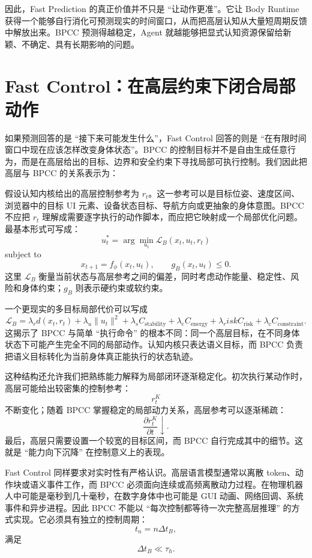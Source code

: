 因此，Fast Prediction 的真正价值并不只是 ``让动作更准''。它让 Body Runtime 获得一个能够自行消化可预测现实的时间窗口，从而把高层认知从大量短周期反馈中解放出来。BPCC 预测得越稳定，Agent 就越能够把显式认知资源保留给新颖、不确定、具有长期影响的问题。

\section{Fast Control：在高层约束下闭合局部动作}

如果预测回答的是 ``接下来可能发生什么''，Fast Control 回答的则是 ``在有限时间窗口中现在应该怎样改变身体状态''。BPCC 的控制目标并不是自由生成任意行为，而是在高层给出的目标、边界和安全约束下寻找局部可执行控制。我们因此把高层与 BPCC 的关系表示为：
\begin{statementbox}
\centering
{}
\end{statementbox}

假设认知内核给出的高层控制参考为 $r_t$。这一参考可以是目标位姿、速度区间、浏览器中的目标 UI 元素、设备状态目标、导航方向或更抽象的身体意图。BPCC 不应把 $r_t$ 理解成需要逐字执行的动作脚本，而应把它映射成一个局部优化问题。最基本形式可写成：
\[
u_t^\ast
=
\arg\min_{u_t}
\mathcal L_B
(x_t,u_t,r_t)
\]
subject to
\[
x_{t+1}=f_\phi(x_t,u_t),
\qquad
g_B(x_t,u_t)\leq0.
\]
这里 $\mathcal L_B$ 衡量当前状态与高层参考之间的偏差，同时考虑动作能量、稳定性、风险和身体约束；$g_B$ 则表示硬约束或软约束。

一个更现实的多目标局部代价可以写成
\[
\mathcal L_B
=
\lambda_r d(x_t,r_t)
+
\lambda_u\|u_t\|^2
+
\lambda_s C_{\mathrm{stability}}
+
\lambda_e C_{\mathrm{energy}}
+
\lambda_risk C_{\mathrm{risk}}
+
\lambda_c C_{\mathrm{constraint}}.
\]
这揭示了 BPCC 与简单 ``执行命令'' 的根本不同：同一个高层目标，在不同身体状态下可能产生完全不同的局部动作。认知内核只表达语义目标，而 BPCC 负责把语义目标转化为当前身体真正能执行的状态轨迹。

这种结构还允许我们把熟练能力解释为局部闭环逐渐稳定化。初次执行某动作时，高层可能给出较密集的控制参考：
\[
r_t^{K}
\]
不断变化；随着 BPCC 掌握稳定的局部动力关系，高层参考可以逐渐稀疏：
\[
\frac{\partial r_t^{K}}{\partial t}
\downarrow.
\]
最后，高层只需要设置一个较宽的目标区间，而 BPCC 自行完成其中的细节。这就是 ``能力向下沉降'' 在控制意义上的表现。

Fast Control 同样要求对实时性有严格认识。高层语言模型通常以离散 token、动作块或语义事件工作，而 BPCC 必须面向连续或高频离散动力过程。在物理机器人中可能是毫秒到几十毫秒，在数字身体中也可能是 GUI 动画、网络回调、系统事件和异步进程。因此 BPCC 不能以 ``每次控制都等待一次完整高层推理'' 的方式实现。它必须具有独立的控制周期：
\[
t_n=n\Delta t_B,
\]
满足
\[
\Delta t_B\ll\tau_h.
\]

